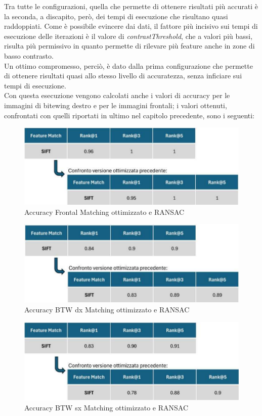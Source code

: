 \documentclass[12pt,a4paper,openright,twoside]{book}
\begin{document}

Tra tutte le configurazioni, quella che permette di ottenere risultati più accurati è la seconda, a discapito, però, dei tempi di esecuzione che risultano quasi raddoppiati. Come è possibile evincere dai dati, il fattore più incisivo sui tempi di esecuzione delle iterazioni è il valore di {\itshape contrastThreshold}, che a valori più bassi, risulta più permissivo in quanto permette di rilevare più feature anche in zone di basso contrasto.\\
Un ottimo compromesso, perciò, è dato dalla prima configurazione che permette di ottenere risultati quasi allo stesso livello di accuratezza, senza inficiare sui tempi di esecuzione.\\
Con questa esecuzione vengono calcolati anche i valori di accuracy per le immagini di bitewing destro e per le immagini frontali; i valori ottenuti, confrontati con quelli riportati in ultimo nel capitolo precedente, sono i seguenti:
\begin{figure}[H]
	\centering
	\includegraphics{figures/frontal7_1.pdf}
    	\caption{Accuracy Frontal Matching ottimizzato e RANSAC}
	\label{fig:frontalransac}
\end{figure}
\begin{figure}[H]
	\centering
	\includegraphics{figures/dx7_1.pdf}
    	\caption{Accuracy BTW dx Matching ottimizzato e RANSAC}
	\label{fig:dxransac}
\end{figure}\begin{figure}[H]
	\centering
	\includegraphics{figures/sx12_1.pdf}
    	\caption{Accuracy BTW sx Matching ottimizzato e RANSAC}
	\label{fig:sxransac}
\end{figure}
\end{document}
